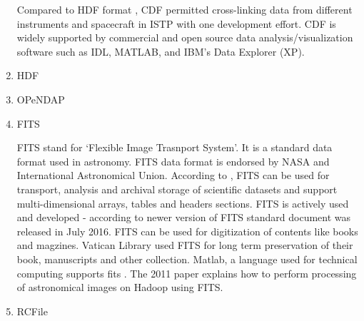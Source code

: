 \begin{enumerate}
Compared to HDF format \label{\detokenize{i524/technologies:id480}}{\hyperref[\detokenize{i524/technologies:www-wiki-hdf}]{\sphinxcrossref{{[}412{]}}}}, CDF permitted
cross-linking data from different instruments and spacecraft in
ISTP with one development effort. CDF is widely supported by
commercial and open source data analysis/visualization software
such as IDL, MATLAB, and IBM’s Data Explorer (XP).

\item {} 
HDF

\item {} 
OPeNDAP

\item {} 
FITS

FITS stand for `Flexible Image Trasnport System'. It is a
standard data format used in astronomy. FITS data format is
endorsed by NASA and International Astronomical Union. According
to \label{\detokenize{i524/technologies:id481}}{\hyperref[\detokenize{i524/technologies:www-fits-nasa}]{\sphinxcrossref{{[}413{]}}}}, FITS can be used for transport,
analysis and archival storage of scientific datasets and support
multi-dimensional arrays, tables and headers sections.  FITS is
actively used and developed - according to
\label{\detokenize{i524/technologies:id482}}{\hyperref[\detokenize{i524/technologies:www-news-fits-2016}]{\sphinxcrossref{{[}414{]}}}} newer version of FITS standard
document was released in July 2016. FITS can be used for
digitization of contents like books and
magzines. Vatican Library \label{\detokenize{i524/technologies:id483}}{\hyperref[\detokenize{i524/technologies:www-fits-vatican-library}]{\sphinxcrossref{{[}415{]}}}} used FITS
for long term preservation of their book, manuscripts and other
collection. Matlab, a language used for technical computing
supports fits \label{\detokenize{i524/technologies:id484}}{\hyperref[\detokenize{i524/technologies:www-fits-matlab}]{\sphinxcrossref{{[}416{]}}}}. The 2011 paper
\label{\detokenize{i524/technologies:id485}}{\hyperref[\detokenize{i524/technologies:paper-fits-2011}]{\sphinxcrossref{{[}417{]}}}} explains how to perform
processing of astronomical images on Hadoop using FITS.

\item {} 
RCFile


\end{enumerate}
